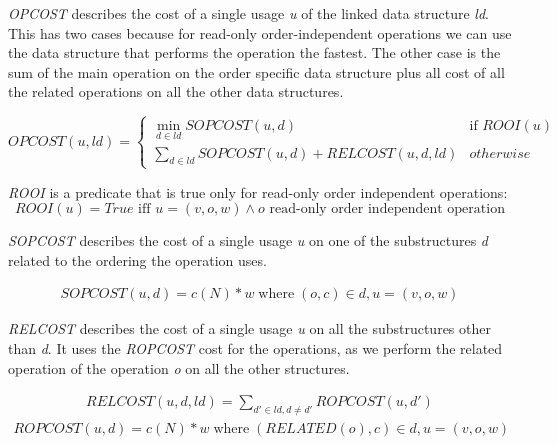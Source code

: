 \documentclass[a4paper,11pt]{article}
\begin{document}
			\emph{OPCOST} describes the cost of a single usage \emph{u} of the linked data structure \emph{ld}. This has two cases because for read-only order-independent operations we can use the data structure that performs the operation the fastest. The other case is the sum of the main operation on the order specific data structure plus all cost of all the related operations on all the other data structures.

            \begin{equation} \label{eqn:opcost}
                OPCOST(u, ld) = \begin{cases}
   						\displaystyle \min_{d \in ld} \mathit{SOPCOST}(u,d) & \text{if } ROOI(u)\\
   						\displaystyle \sum_{d \in ld} \mathit{SOPCOST}(u,d) + \mathit{RELCOST}(u, d, ld) & \mathit{otherwise}
  					\end{cases}
            \end{equation}

            \emph{ROOI} is a predicate that is true only for read-only order independent operations:
            \begin{equation}
                \mathit{ROOI}(u) = \mathit{True} \text{ iff }u = (v, o, w) \wedge o \text{ read-only order independent operation}
            \end{equation}

            \emph{SOPCOST} describes the cost of a single usage \emph{u} on one of the substructures \emph{d}
            related to the ordering the operation uses.

			\begin{eqnarray}
				\mathit{SOPCOST}(u,d) = c(N) * w \; \textrm{where} \; (o,c) \in d, u = (v, o, w)
            \end{eqnarray}

			\emph{RELCOST} describes the cost of a single usage \emph{u} on all the substructures other than \emph{d}. It uses the \emph{ROPCOST} cost for the operations, as we perform the related operation of the operation \emph{o} on all the other structures.

            \begin{eqnarray}
                \mathit{RELCOST}(u, d, ld) = \sum_{d' \in ld, d \neq d'} \mathit{ROPCOST}(u,d')
            \end{eqnarray}
            \begin{eqnarray}
                \mathit{ROPCOST}(u,d) = c(N) * w \; \textrm{where} \; (\mathit{RELATED}(o),c) \in d, u = (v, o, w)
            \end{eqnarray}
\end{document}
